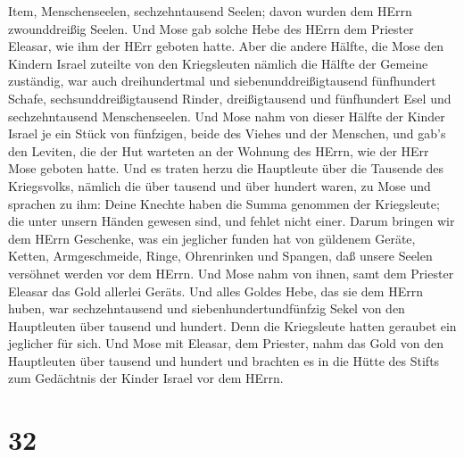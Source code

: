 Item, Menschenseelen, sechzehntausend Seelen; davon wurden dem HErrn
zwounddreißig Seelen.  Und Mose gab solche Hebe des HErrn
dem Priester Eleasar, wie ihm der HErr geboten hatte.  Aber
die andere Hälfte, die Mose den Kindern Israel zuteilte von den
Kriegsleuten  nämlich die Hälfte der Gemeine zuständig, war
auch dreihundertmal und siebenunddreißigtausend fünfhundert Schafe,
 sechsunddreißigtausend Rinder, 
dreißigtausend und fünfhundert Esel  und sechzehntausend
Menschenseelen.  Und Mose nahm von dieser Hälfte der Kinder
Israel je ein Stück von fünfzigen, beide des Viehes und der Menschen,
und gab's den Leviten, die der Hut warteten an der Wohnung des HErrn,
wie der HErr Mose geboten hatte.  Und es traten herzu die
Hauptleute über die Tausende des Kriegsvolks, nämlich die über tausend
und über hundert waren, zu Mose  und sprachen zu ihm: Deine
Knechte haben die Summa genommen der Kriegsleute; die unter unsern
Händen gewesen sind, und fehlet nicht einer.  Darum bringen
wir dem HErrn Geschenke, was ein jeglicher funden hat von güldenem
Geräte, Ketten, Armgeschmeide, Ringe, Ohrenrinken und Spangen, daß
unsere Seelen versöhnet werden vor dem HErrn.  Und Mose
nahm von ihnen, samt dem Priester Eleasar das Gold allerlei Geräts.
 Und alles Goldes Hebe, das sie dem HErrn huben, war
sechzehntausend und siebenhundertundfünfzig Sekel von den Hauptleuten
über tausend und hundert.  Denn die Kriegsleute hatten
geraubet ein jeglicher für sich.  Und Mose mit Eleasar, dem
Priester, nahm das Gold von den Hauptleuten über tausend und hundert und
brachten es in die Hütte des Stifts zum Gedächtnis der Kinder Israel vor
dem HErrn.

\hypertarget{section-31}{%
\section{32}\label{section-31}}

